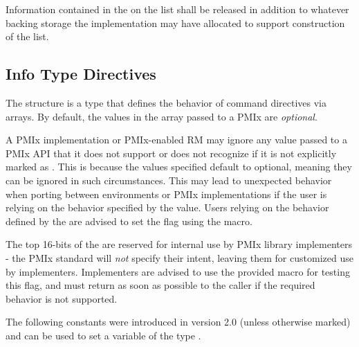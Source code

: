 Information contained in the  on the list shall be released in addition to whatever backing storage the implementation may have allocated to support construction of the list.


\subsection{Info Type Directives}
\label{api:struct:infodirs}

The  structure is a  type that defines the behavior of command directives via  arrays.
By default, the values in the  array passed to a PMIx are \emph{optional}.

\adviceuserstart
A PMIx implementation or PMIx-enabled \ac{RM} may ignore any  value passed to a \ac{PMIx} \ac{API} that it does not support or does not recognize if it is not explicitly marked as .
This is because the values specified default to optional, meaning they can be ignored in such circumstances.
This may lead to unexpected behavior when porting between environments or \ac{PMIx} implementations if the user is relying on the behavior specified by the  value.
Users relying on the behavior defined by the  are advised to set the  flag using the  macro.
\adviceuserend

\adviceimplstart
The top 16-bits of the  are reserved for internal use by \ac{PMIx} library implementers - the \ac{PMIx} standard will \textit{not} specify their intent, leaving them for customized use by implementers. Implementers are advised to use the provided  macro for testing this flag, and must return  as soon as possible to the caller if the required behavior is not supported.
\adviceimplend

The following constants were introduced in version 2.0 (unless otherwise marked) and can be used to set a variable of the type .

